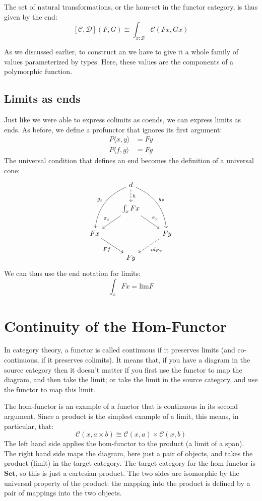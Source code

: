 \documentclass[DaoFP]{subfiles}
\begin{document}
The set of natural transformations, or the hom-set in the functor category, is thus given by the end:
\[ [\mathcal{C}, \mathcal{D}] (F, G) \cong \int_{x \colon  \mathcal{B}} \mathcal{C}(F x, G x)\]

As we discussed earlier, to construct an  we have to give it a whole family of values parameterized by types. Here, these values are the components of a polymorphic function. 

\subsection{Limits as ends}
Just like we were able to express colimits as coends, we can express limits as ends. As before, we define a profunctor that ignores its first argument:
\begin{align*}
 P \langle x, y \rangle &= F y \\
 P \langle f, g \rangle &= F g 
\end{align*}
The universal condition that defines an end becomes the definition of a universal cone:
\[
 \begin{tikzcd}
 &d
 \arrow[ddl, bend right, "g_x"']
 \arrow[ddr, bend left, "g_y"]
 \arrow[d, dashed, "h"]
 \\
 & \int_x F x
 \arrow[ld, "\pi_x"']
 \arrow[rd, "\pi_y"]
 \\
 F x
 \arrow[dr, "F f"']
 &&F y
 \arrow[dl, dashed, "id_{F y}"]
 \\
 & F y
 \end{tikzcd}
\]
We can thus use the end notation for limits:
\[ \int_x F x = \text{lim} F \]

\section{Continuity of the Hom-Functor}

In category theory, a functor is called continuous if it preserves limits (and co-continuous, if it preserves colimits). It means that, if you have a diagram in the source category then it doesn't matter if you first use the functor to map the diagram, and then take the limit; or take the limit in the source category, and use the functor to map this limit. 

The hom-functor is an example of a functor that is continuous in its second argument. Since a product is the simplest example of a limit, this means, in particular, that:
\[ \mathcal{C}(x, a \times b) \cong \mathcal{C}(x, a) \times \mathcal{C}(x, b) \]
The left hand side applies the hom-functor to the product (a limit of a span). The right hand side maps the diagram, here just a pair of objects, and takes the product (limit) in the target category. The target category for the hom-functor is $\mathbf{Set}$, so this is just a cartesian product. The two sides are isomorphic by the universal property of the product: the mapping into the product is defined by a pair of mappings into the two objects. 
\end{document}
